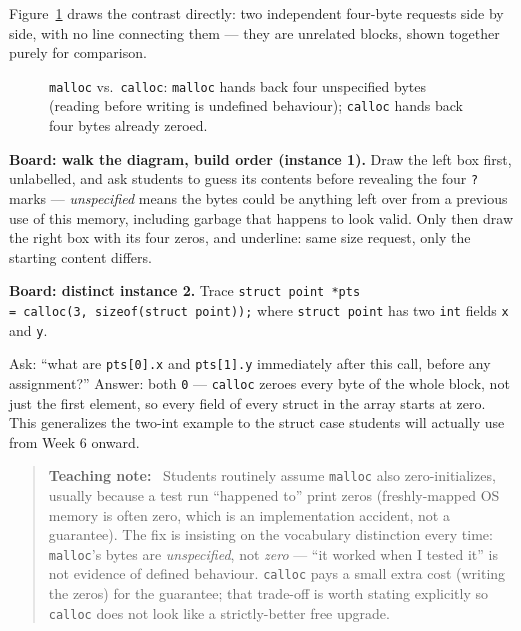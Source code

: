 \documentclass[11pt]{article}
\newenvironment{teachingaside}{\begin{quote}\small\color{primary-gold}\textbf{Teaching note:}\ }{\end{quote}}
\begin{document}
Figure~\ref{fig:malloc-calloc} draws the contrast directly: two independent four-byte requests side by side, with no line connecting them --- they are unrelated blocks, shown together purely for comparison.

\begin{figure}[h]
  \centering
  \caption{\texttt{malloc} vs.\ \texttt{calloc}: \texttt{malloc} hands back
  four unspecified bytes (reading before writing is undefined behaviour);
  \texttt{calloc} hands back four bytes already zeroed.}
  \label{fig:malloc-calloc}
\end{figure}

\textbf{Board: walk the diagram, build order (instance 1).} Draw the left box first, unlabelled, and ask students to guess its contents before revealing the four \texttt{?} marks --- \emph{unspecified} means the bytes could be anything left over from a previous use of this memory, including garbage that happens to look valid. Only then draw the right box with its four zeros, and underline: same size request, only the starting content differs.

{\sloppy\textbf{Board: distinct instance 2.} Trace \texttt{struct point *pts =\allowbreak\ calloc(3,\allowbreak\ sizeof(struct point));} where \texttt{struct point} has two \texttt{int} fields \texttt{x} and \texttt{y}.\par} Ask: ``what are \texttt{pts[0].x} and \texttt{pts[1].y} immediately after this call, before any assignment?'' Answer: both \texttt{0} --- \texttt{calloc} zeroes every byte of the whole block, not just the first element, so every field of every struct in the array starts at zero. This generalizes the two-int example to the struct case students will actually use from Week 6 onward.

\begin{teachingaside}
Students routinely assume \texttt{malloc} also zero-initializes, usually because a test run ``happened to'' print zeros (freshly-mapped OS memory is often zero, which is an implementation accident, not a guarantee). The fix is insisting on the vocabulary distinction every time: \texttt{malloc}'s bytes are \emph{unspecified}, not \emph{zero} --- ``it worked when I tested it'' is not evidence of defined behaviour. \texttt{calloc} pays a small extra cost (writing the zeros) for the guarantee; that trade-off is worth stating explicitly so \texttt{calloc} does not look like a strictly-better free upgrade.
\end{teachingaside}
\end{document}
